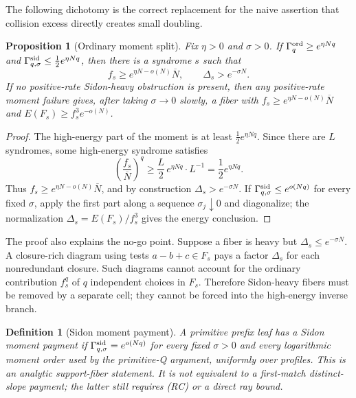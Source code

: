 \documentclass[12pt,a4paper]{amsart}
\numberwithin{equation}{section}
\newtheorem{proposition}[proposition]{Proposition}
\newtheorem{definition}[definition]{Definition}
\theoremstyle{remark}
\newcommand{\Gord}{\Gamma^{\rm ord}}
\newcommand{\Gsid}{\Gamma^{\rm sid}}
\newcommand{\barN}{\overline N}
\begin{document}
The following dichotomy is the correct replacement for the naive assertion that collision excess directly creates small doubling.

\begin{proposition}[Ordinary moment split]\label{prop:ordinary-moment-split}
Fix \(\eta>0\) and \(\sigma>0\).  If \(\Gord_q\ge e^{\eta Nq}\) and \(\Gsid_{q,\sigma}\le \frac12 e^{\eta Nq}\), then there is a syndrome \(s\) such that
\[
        f_s\ge e^{\eta N-o(N)}\barN,
        \qquad
        \Delta_s>e^{-\sigma N}.
\]
If no positive-rate Sidon-heavy obstruction is present, then any positive-rate moment failure gives, after taking \(\sigma\to0\) slowly, a fiber with \(f_s\ge e^{\eta N-o(N)}\barN\) and \(E(F_s)\ge f_s^3e^{-o(N)}\).
\end{proposition}

\begin{proof}
The high-energy part of the moment is at least \(\frac12e^{\eta Nq}\).  Since there are \(L\) syndromes, some high-energy syndrome satisfies
\[
        \left(\frac{f_s}{\barN}\right)^q
        \ge \frac{L}{2}\,e^{\eta Nq}\cdot L^{-1}
        =\frac12 e^{\eta Nq}.
\]
Thus \(f_s\ge e^{\eta N-o(N)}\barN\), and by construction \(\Delta_s>e^{-\sigma N}\).  If \(\Gsid_{q,\sigma}\le e^{o(Nq)}\) for every fixed \(\sigma\), apply the first part along a sequence \(\sigma_j\downarrow0\) and diagonalize; the normalization \(\Delta_s=E(F_s)/f_s^3\) gives the energy conclusion.
\end{proof}

The proof also explains the no-go point.  Suppose a fiber is heavy but \(\Delta_s\le e^{-\sigma N}\).  A closure-rich diagram using tests \(a-b+c\in F_s\) pays a factor \(\Delta_s\) for each nonredundant closure.  Such diagrams cannot account for the ordinary contribution \(f_s^q\) of \(q\) independent choices in \(F_s\).  Therefore Sidon-heavy fibers must be removed by a separate cell; they cannot be forced into the high-energy inverse branch.

\begin{definition}[Sidon moment payment]\label{def:sidon-paid-cell}
A primitive prefix leaf has a Sidon moment payment if
\(\Gsid_{q,\sigma}=e^{o(Nq)}\) for every fixed \(\sigma>0\) and every
logarithmic moment order used by the primitive-Q argument, uniformly over
profiles.  This is an analytic support-fiber statement.  It is not
equivalent to a first-match distinct-slope payment; the latter still
requires \textup{(RC)} or a direct ray bound.
\end{definition}
\end{document}
